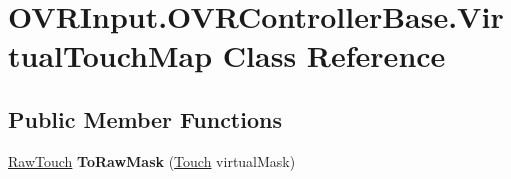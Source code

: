 \hypertarget{class_o_v_r_input_1_1_o_v_r_controller_base_1_1_virtual_touch_map}{}\section{O\+V\+R\+Input.\+O\+V\+R\+Controller\+Base.\+Virtual\+Touch\+Map Class Reference}
\label{class_o_v_r_input_1_1_o_v_r_controller_base_1_1_virtual_touch_map}
\subsection*{Public Member Functions}
\begin{DoxyCompactItemize}
\item 
\mbox{\label{class_o_v_r_input_1_1_o_v_r_controller_base_1_1_virtual_touch_map_acbb6786ddacc609c85bd782f47821d05}} 
\mbox{\hyperlink{class_o_v_r_input_a6e130faa2035c5b20853c1177d909cc6}{Raw\+Touch}} {\bfseries To\+Raw\+Mask} (\mbox{\hyperlink{class_o_v_r_input_a4e1f1eb856223383aefc1965dd2db39a}{Touch}} virtual\+Mask)
\end{DoxyCompactItemize}
